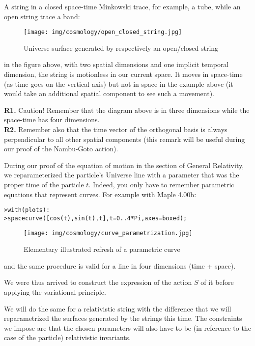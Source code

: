 	A string in a closed space-time Minkowski trace, for example, a tube, while an open string trace a band:
	\begin{figure}[H]
		\begin{center}
		\texttt{[image: img/cosmology/open\_closed\_string.jpg]}
		\end{center}	
		\caption{Universe surface generated by respectively an open/closed string}
	\end{figure}
	in the figure above, with two spatial dimensions and one implicit temporal dimension, the string is motionless in our current space. It moves in space-time (as time goes on the vertical axis) but not in space in the example above (it would take an additional spatial component to see such a movement).
	\begin{tcolorbox}[title=Remark,colframe=black,arc=10pt]
	\textbf{R1.} Caution! Remember that the diagram above is in three dimensions while the space-time has four dimensions.\\
	
	\textbf{R2.} Remember also that the time vector of the orthogonal basis is always perpendicular to all other spatial components (this remark will be useful during our proof of the Nambu-Goto action).
	\end{tcolorbox}
	
	During our proof of the equation of motion in the section of General Relativity, we reparameterized the particle's Universe line with a parameter that was the proper time of the particle $t$. Indeed, you only have to remember parametric equations that represent curves. For example with Maple 4.00b:
	
	\texttt{>with(plots):}\\
	\texttt{>spacecurve([cos(t),sin(t),t],t=0..4*Pi,axes=boxed);}
	
	\begin{figure}[H]
		\begin{center}
		\texttt{[image: img/cosmology/curve\_parametrization.jpg]}
		\end{center}	
		\caption{Elementary illustrated refresh of a parametric curve}
	\end{figure}
	and the same procedure is valid for a line in four dimensions (time + space).
	
	We were thus arrived to construct the expression of the action $S$ of it before applying the variational principle.
	
	We will do the same for a relativistic string with the difference that we will reparametrized the surfaces generated by the strings this time. The constraints we impose are that the chosen parameters will also have to be (in reference to the case of the particle) relativistic invariants.
	

